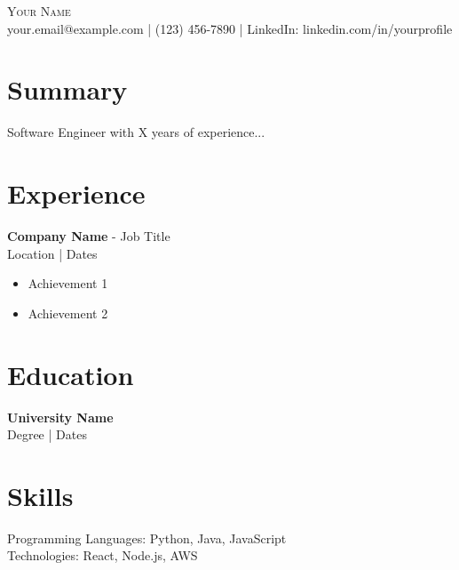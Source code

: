 \documentclass[letterpaper,10pt]{article}
\begin{document}
\begin{center}
    {\Huge \scshape Your Name} \\ \vspace{1pt}
    your.email@example.com | (123) 456-7890 | LinkedIn: linkedin.com/in/yourprofile
\end{center}

\section{Summary}
Software Engineer with X years of experience...

\section{Experience}
\textbf{Company Name} - Job Title \\
Location | Dates
\begin{itemize}
    \item Achievement 1
    \item Achievement 2
\end{itemize}

\section{Education}
\textbf{University Name} \\
Degree | Dates

\section{Skills}
Programming Languages: Python, Java, JavaScript \\
Technologies: React, Node.js, AWS
\end{document}
